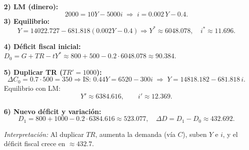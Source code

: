 \documentclass[11pt,addpoints]{article}
\begin{document}
\begin{enumerate}
\begin{enumerate}[label=\arabic*.]
\textbf{2) LM (dinero):} 
\[
2000 = 10Y - 5000i \;\Rightarrow\; \boxed{i = 0.002\,Y - 0.4}.
\]
\newpage
\vspace*{0.1cm}
\textbf{3) Equilibrio:}
\[
Y = 14022.727 - 681.818(0.002Y - 0.4) 
\Rightarrow Y^* \approx 6048.078,\quad
i^* \approx 11.696.
\]

\textbf{4) Déficit fiscal inicial:}\quad
$D_0 = G + TR - tY^* \approx 800 + 500 - 0.2\cdot 6048.078 \approx 90.384$.

\textbf{5) Duplicar TR ($TR'=1000$):}
\[
\Delta C_0 = 0.7\cdot 500 = 350 \Rightarrow 
\text{IS: } 0.44Y = 6520 - 300i \;\Rightarrow\; 
\boxed{Y = 14818.182 - 681.818\, i}.
\]
Equilibrio con LM:
\[
Y' \approx 6384.616,\qquad i' \approx 12.369.
\]

\textbf{6) Nuevo déficit y variación:}
\[
D_1 = 800 + 1000 - 0.2\cdot 6384.616 \approx 523.077,\quad
\Delta D = D_1 - D_0 \approx \boxed{432.692}.
\]

\textit{Interpretación:} Al duplicar $TR$, aumenta la demanda (vía $C$), suben $Y$ e $i$, y el déficit fiscal crece en $\approx 432.7$. 


\end{enumerate}

\end{enumerate}
\end{document}
